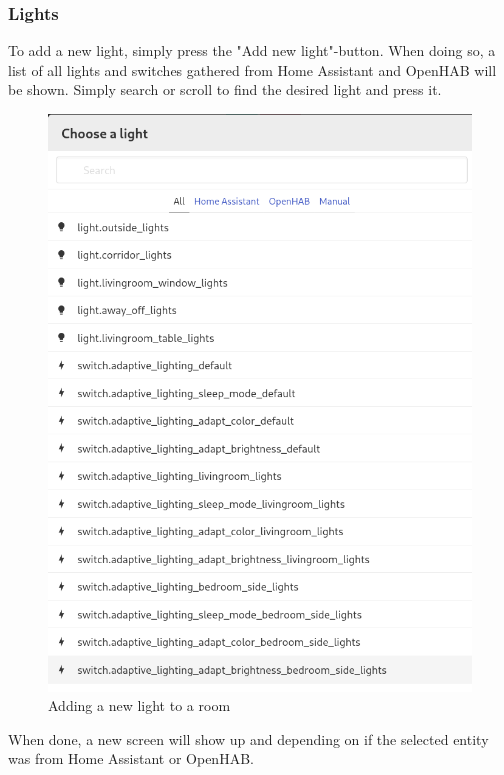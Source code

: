 \documentclass[10pt]{article}
\begin{document}
    \subsubsection{Lights}
    To add a new light, simply press the "Add new light"-button. When doing so, a list of all lights and switches gathered from Home Assistant and OpenHAB will be shown. Simply search or scroll to find the desired light and press it.
    \begin{figure}[H]
    \centering
    \includegraphics[scale=0.25]{add_new_light.png}
    \caption{Adding a new light to a room}%
    \end{figure}
    
    When done, a new screen will show up and depending on if the selected entity was from Home Assistant or OpenHAB.
\end{document}
